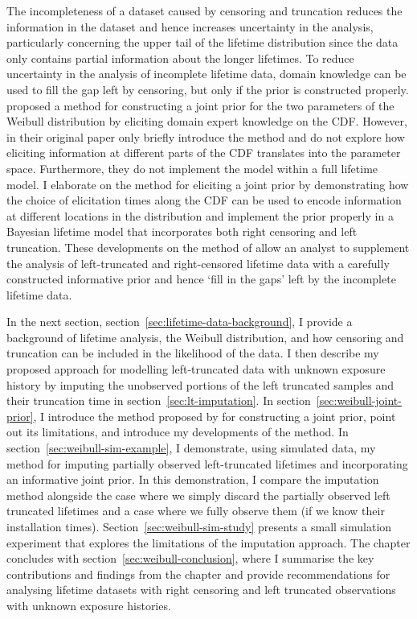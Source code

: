 The incompleteness of a dataset caused by censoring and truncation reduces the information in the dataset and hence increases uncertainty in the analysis, particularly concerning the upper tail of the lifetime distribution since the data only contains partial information about the longer lifetimes. To reduce uncertainty in the analysis of incomplete lifetime data, domain knowledge can be used to fill the gap left by censoring, but only if the prior is constructed properly. \citet{kaminskiy2005} proposed a method for constructing a joint prior for the two parameters of the Weibull distribution by eliciting domain expert knowledge on the CDF. However, in their original paper \citeauthor{kaminskiy2005} only briefly introduce the method and do not explore how eliciting information at different parts of the CDF translates into the parameter space. Furthermore, they do not implement the model within a full lifetime model. I elaborate on the method for eliciting a joint prior by demonstrating how the choice of elicitation times along the CDF can be used to encode information at different locations in the distribution and implement the prior properly in a Bayesian lifetime model that incorporates both right censoring and left truncation. These developments on the method of \citet{kaminskiy2005} allow an analyst to supplement the analysis of left-truncated and right-censored lifetime data with a carefully constructed informative prior and hence `fill in the gaps' left by the incomplete lifetime data.

In the next section, section~\ref{sec:lifetime-data-background}, I provide a background of lifetime analysis, the Weibull distribution, and how censoring and truncation can be included in the likelihood of the data. I then describe my proposed approach for modelling left-truncated data with unknown exposure history by imputing the unobserved portions of the left truncated samples and their truncation time in section~\ref{sec:lt-imputation}. In section~\ref{sec:weibull-joint-prior}, I introduce the method proposed by \citet{kaminskiy2005} for constructing a joint prior, point out its limitations, and introduce my developments of the method. In section~\ref{sec:weibull-sim-example}, I demonstrate, using simulated data, my method for imputing partially observed left-truncated lifetimes and incorporating an informative joint prior. In this demonstration, I compare the imputation method alongside the case where we simply discard the partially observed left truncated lifetimes and a case where we fully observe them (if we know their installation times). Section~\ref{sec:weibull-sim-study} presents a small simulation experiment that explores the limitations of the imputation approach. The chapter concludes with section~\ref{sec:weibull-conclusion}, where I summarise the key contributions and findings from the chapter and provide recommendations for analysing lifetime datasets with right censoring and left truncated observations with unknown exposure histories.

